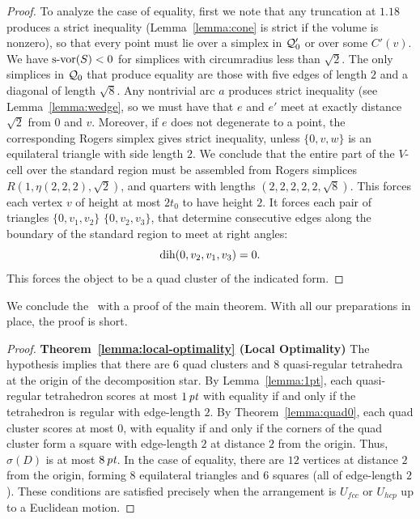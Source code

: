 \begin{proof}
To analyze the case of equality, first we note that any truncation
at $1.18$ produces a strict inequality (Lemma~\ref{lemma:cone} is
strict if the volume is nonzero), so that every point must lie
over a simplex in ${\mathcal Q}_0'$ or over some $C'(v)$. We have
$\operatorname{s-vor}(S)<0$ for simplices with circumradius less than $\sqrt2$.
The only simplices in ${\mathcal Q}_0$ that produce equality are those
with five edges of length $2$ and a diagonal of length $\sqrt8$.
Any nontrivial arc $a$ produces strict inequality (see
Lemma~\ref{lemma:wedge}, so we must have that $e$ and $e'$ meet at
exactly distance $\sqrt2$ from $0$ and $v$.  Moreover, if $e$ does
not degenerate to a point, the corresponding Rogers simplex gives
strict inequality, unless $\{0,v,w\}$ is an equilateral triangle
with side length $2$.  We conclude that the entire part of the
$V$-cell over the standard region must be assembled from Rogers
simplices $R(1,\eta(2,2,2),\sqrt2)$, and quarters with lengths
$(2,2,2,2,2,\sqrt8)$.  This forces each vertex $v$ of height at
most $2t_0$ to have height $2$.  It forces each pair of triangles
$\{0,v_1,v_2\}$ $\{0,v_2,v_3\}$, that determine consecutive edges
along the boundary of the standard region to meet at right angles:
    $$\operatorname{dih}(0,v_2,v_1,v_3)=0.$$
This forces the object to be a quad cluster of the indicated form.
\end{proof}

We conclude the \chap\ with a proof of the main theorem.  With all
our preparations in place, the proof is short.

\begin{proof} {\bf Theorem~\ref{lemma:local-optimality} (Local
Optimality)} The hypothesis implies that there are $6$ quad clusters
and $8$ quasi-regular tetrahedra at the origin of the decomposition
star. By Lemma~\ref{lemma:1pt}, each quasi-regular tetrahedron
scores at most $1\,\hbox{\it pt}$ with equality if and only if the tetrahedron
is regular with edge-length $2$.  By Theorem~\ref{lemma:quad0}, each
quad cluster scores at most $0$, with equality if and only if the
corners of the quad cluster form a square with edge-length $2$ at
distance $2$ from the origin. Thus, $\sigma(D)$ is at most $8\,\hbox{\it pt}$.
In the case of equality, there are $12$ vertices at distance $2$
from the origin, forming $8$ equilateral triangles and $6$ squares
(all of edge-length $2$). These conditions are satisfied precisely
when the arrangement is $U_{fcc}$ or $U_{hcp}$ up to a Euclidean
motion.
\end{proof}
